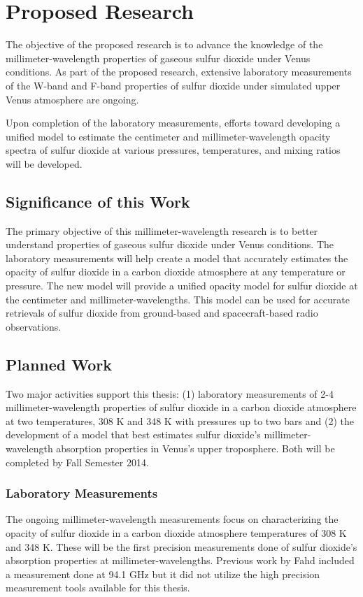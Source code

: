 \section{Proposed Research}
The objective of the proposed research is to advance the knowledge of the millimeter-wavelength properties of gaseous sulfur dioxide under Venus conditions. As part of the proposed research, extensive laboratory measurements of the W-band and F-band properties of sulfur dioxide under simulated upper Venus atmosphere are ongoing. 

Upon completion of the laboratory measurements, efforts toward developing a unified model to estimate the centimeter and millimeter-wavelength opacity spectra of sulfur dioxide at various pressures, temperatures, and mixing ratios will be developed. 

\subsection{Significance of this Work}
The primary objective of this millimeter-wavelength research is to better understand properties of gaseous sulfur dioxide under Venus conditions. The laboratory measurements will help create a model that accurately estimates the opacity of sulfur dioxide in a carbon dioxide atmosphere at any temperature or pressure. The new model will provide a unified opacity model for sulfur dioxide at the centimeter and millimeter-wavelengths. This model can be used for accurate retrievals of sulfur dioxide from ground-based and spacecraft-based radio observations. 
\subsection{Planned Work}

Two major activities support this thesis: (1) laboratory measurements of 2-4 millimeter-wavelength properties of sulfur dioxide in a carbon dioxide atmosphere at two temperatures, 308 K and 348 K with pressures up to two bars and (2) the development of a model that best estimates sulfur dioxide's millimeter-wavelength absorption properties in Venus's upper troposphere. Both will be completed by Fall Semester 2014.


\subsubsection{Laboratory Measurements}

The ongoing millimeter-wavelength measurements  focus on characterizing the opacity of sulfur dioxide in a carbon dioxide atmosphere temperatures of 308 K and 348 K. These will be the first precision measurements done of sulfur dioxide's absorption properties at millimeter-wavelengths. Previous work by Fahd \cite{fahd-so2} included a measurement done at 94.1 GHz but it did not utilize the high precision measurement tools available for this thesis.  

